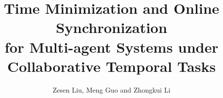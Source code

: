 \documentclass[5p]{elsarticle}
\theoremstyle{definition}
\begin{document}
\begin{frontmatter}

\title{Time Minimization and Online Synchronization\\ for Multi-agent Systems under \\
	Collaborative Temporal Tasks}


\author{Zesen Liu, Meng Guo and Zhongkui Li }
\address{State Key Laboratory for Turbulence and Complex Systems,Department of Mechanics and Engineering Science,\\
	College of Engineering, Peking University, Beijing 100871, China.}


	
	

\end{frontmatter}
	

%	





%
%

%
\end{document}
